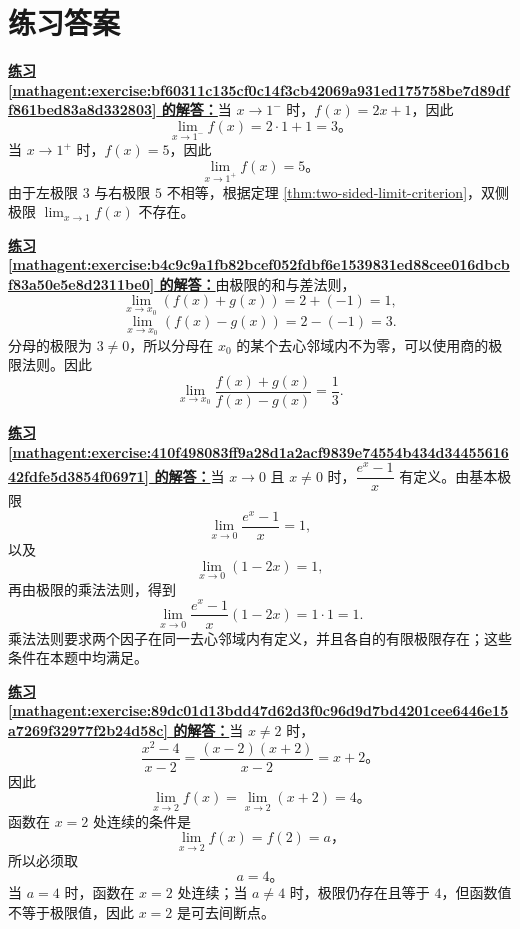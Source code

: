 \documentclass[UTF8,fontset=fandol,11pt]{ctexart}
\begin{document}
\section*{练习答案}
\par\noindent\textbf{\hyperref[mathagent:exercise:bf60311c135cf0c14f3cb42069a931ed175758be7d89dff861bed83a8d332803]{练习 \ref*{mathagent:exercise:bf60311c135cf0c14f3cb42069a931ed175758be7d89dff861bed83a8d332803} 的解答：}}当 $x\to1^-$ 时，$f(x)=2x+1$，因此
\[
\lim_{x\to1^-}f(x)=2\cdot1+1=3\text{。}
\]
当 $x\to1^+$ 时，$f(x)=5$，因此
\[
\lim_{x\to1^+}f(x)=5\text{。}
\]
由于左极限 $3$ 与右极限 $5$ 不相等，根据定理 \ref{thm:two-sided-limit-criterion}，双侧极限 $\lim_{x\to1}f(x)$ 不存在。\par
\par\noindent\textbf{\hyperref[mathagent:exercise:b4c9c9a1fb82bcef052fdbf6e1539831ed88cee016dbcbf83a50e5e8d2311be0]{练习 \ref*{mathagent:exercise:b4c9c9a1fb82bcef052fdbf6e1539831ed88cee016dbcbf83a50e5e8d2311be0} 的解答：}}由极限的和与差法则，
\[
\lim_{x\to x_0}(f(x)+g(x))=2+(-1)=1,
\]
\[
\lim_{x\to x_0}(f(x)-g(x))=2-(-1)=3.
\]
分母的极限为 $3\neq0$，所以分母在 $x_0$ 的某个去心邻域内不为零，可以使用商的极限法则。因此
\[
\lim_{x\to x_0}\frac{f(x)+g(x)}{f(x)-g(x)}=\frac{1}{3}.
\]\par
\par\noindent\textbf{\hyperref[mathagent:exercise:410f498083ff9a28d1a2acf9839e74554b434d3445561642fdfe5d3854f06971]{练习 \ref*{mathagent:exercise:410f498083ff9a28d1a2acf9839e74554b434d3445561642fdfe5d3854f06971} 的解答：}}当 $x\to0$ 且 $x\neq0$ 时，$\dfrac{e^x-1}{x}$ 有定义。由基本极限
\[
\lim_{x\to0}\frac{e^x-1}{x}=1,
\]
以及
\[
\lim_{x\to0}(1-2x)=1,
\]
再由极限的乘法法则，得到
\[
\lim_{x\to0}\frac{e^x-1}{x}(1-2x)=1\cdot1=1.
\]
乘法法则要求两个因子在同一去心邻域内有定义，并且各自的有限极限存在；这些条件在本题中均满足。\par
\par\noindent\textbf{\hyperref[mathagent:exercise:89dc01d13bdd47d62d3f0c96d9d7bd4201cee6446e15a7269f32977f2b24d58c]{练习 \ref*{mathagent:exercise:89dc01d13bdd47d62d3f0c96d9d7bd4201cee6446e15a7269f32977f2b24d58c} 的解答：}}当 $x\neq2$ 时，
\[
\frac{x^2-4}{x-2}=\frac{(x-2)(x+2)}{x-2}=x+2\text{。}
\]
因此
\[
\lim_{x\to2}f(x)=\lim_{x\to2}(x+2)=4\text{。}
\]
函数在 $x=2$ 处连续的条件是
\[
\lim_{x\to2}f(x)=f(2)=a\text{，}
\]
所以必须取
\[
a=4\text{。}
\]
当 $a=4$ 时，函数在 $x=2$ 处连续；当 $a\neq4$ 时，极限仍存在且等于 $4$，但函数值不等于极限值，因此 $x=2$ 是可去间断点。\par
\end{document}
